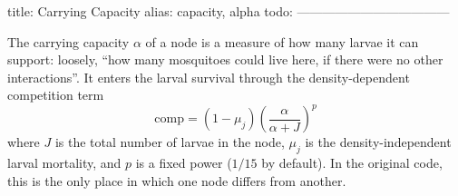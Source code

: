 title: Carrying Capacity
alias: capacity, alpha
todo:
------------------------------------


The carrying capacity $\alpha$ of a node is a measure of how many larvae it can support: loosely, ``how many mosquitoes could live here, if there were no other interactions''. It enters the larval survival through the density-dependent competition term
\begin{equation}
	\mathrm{comp} = (1 - \mu_j) \left( \frac{\alpha}{\alpha + J} \right)^{p}
\end{equation}
where $J$ is the total number of larvae in the node, $\mu_j$ is the density-independent larval mortality, and $p$ is a fixed power ($1/15$ by default). In the original code, this is the only place in which one node differs from another.
%
%
%
%
%
%
